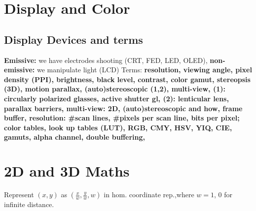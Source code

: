 \documentclass[a4paper]{article}
\begin{document}
\section{Display and Color}
\subsection{Display Devices and terms}
\textbf{Emissive: } we have electrodes shooting (CRT, FED, LED, OLED), \textbf{non-emissive:} we manipulate light (LCD) 
\noindent
Terms:
\textbf{resolution, viewing angle, pixel density (PPI), brightness, black level, contrast, color gamut, stereopsis (3D), motion parallax, (auto)stereoscopic (1,2), multi-view, (1): circularly polarized glasses, active shutter gl, (2): lenticular lens, parallax barriers, multi-view: 2D, (auto)stereoscopic and how, frame buffer, resolution: \#scan lines, \#pixels per scan line, bits per pixel; color tables, look up tables (LUT), RGB, CMY, HSV, YIQ, CIE, gamuts, alpha channel, double buffering, } 

\section{2D and 3D Maths}
Represent $(x,y)$ as $(\frac{x}{w},\frac{y}{w},w)$ in hom. coordinate rep.,where $w = 1$, 0 for infinite distance.  
\end{document}
